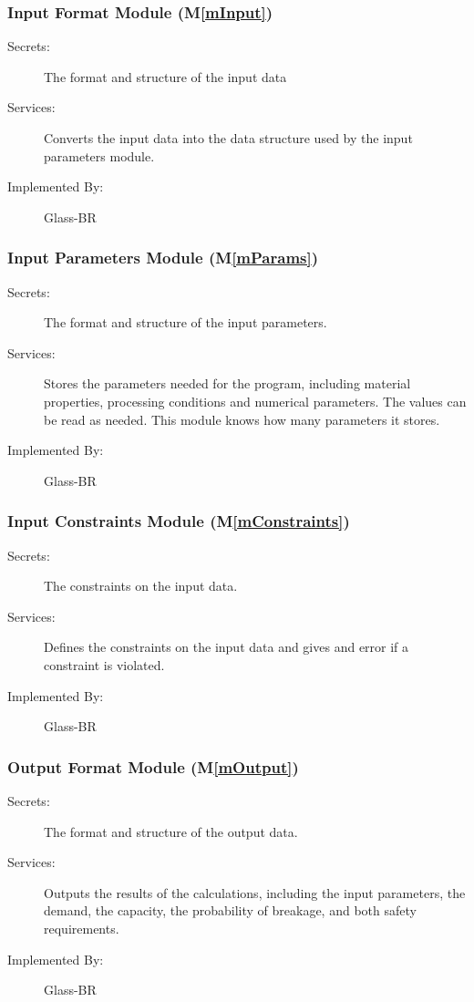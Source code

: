 \documentclass[12pt]{article}
\newcommand{\mref}[1]{M\ref{#1}}
\begin{document}
\subsubsection{Input Format Module (\mref{mInput})}

\begin{description}
\item[Secrets:]The format and structure of the input data
\item[Services:]Converts the input data into the data structure used by the
  input parameters module.
\item[Implemented By:] Glass-BR
\end{description}

\subsubsection{Input Parameters Module (\mref{mParams})}

\begin{description}
\item[Secrets:]The format and structure of the input parameters.
\item[Services:]Stores the parameters needed for the program, including material
  properties, processing conditions and numerical parameters.  The values can be
  read as needed.  This module knows how many parameters it stores.
\item[Implemented By:] Glass-BR
\end{description}

\subsubsection{Input Constraints Module (\mref{mConstraints})}

\begin{description}
\item[Secrets:]The constraints on the input data.
\item[Services:]Defines the constraints on the input data and gives and error 
if a constraint is violated.
\item[Implemented By:] Glass-BR
\end{description}

\subsubsection{Output Format Module (\mref{mOutput})}

\begin{description}
\item[Secrets:] The format and structure of the output data.
\item[Services:] Outputs the results of the calculations, including the input
  parameters, the demand, the capacity, the probability of breakage, and both 
  safety requirements.
\item[Implemented By:] Glass-BR
\end{description} 
\end{document}

